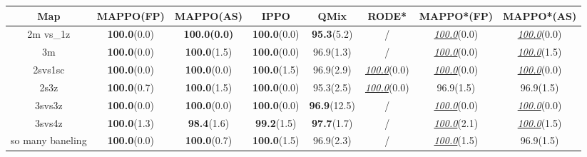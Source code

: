 \documentclass{article}
\theoremstyle{plain}
\theoremstyle{definition}
\theoremstyle{remark}
\begin{document}
\begin{table}[t!]
\centering
\addtolength{\tabcolsep}{-4pt}    
\begin{tabular}{ccccc|ccc}
\toprule 
Map              & MAPPO\scriptsize{(FP)}  & MAPPO\scriptsize{(AS)}  & IPPO       & QMix       & RODE*        & MAPPO*\scriptsize{(FP)}  & MAPPO*\scriptsize{(AS)}  \\
\midrule
\scriptsize{2m vs\_1z}        & \textbf{100.0}\scriptsize{(0.0)} & \textbf{100.0\scriptsize{(0.0)}} & \textbf{100.0}\scriptsize{(0.0)} & \textbf{95.3}\scriptsize{(5.2)}  & /           & \emph{\underline{100.0}}\scriptsize{(0.0)} & \emph{\underline{100.0}}\scriptsize{(0.0)} \\
\scriptsize{3m}               & \textbf{100.0}\scriptsize{(0.0)} & \textbf{100.0}\scriptsize{(1.5)} & \textbf{100.0}\scriptsize{(0.0)} & 96.9\scriptsize{(1.3)}  & /           & \emph{\underline{100.0}}\scriptsize{(0.0)} & \emph{\underline{100.0}}\scriptsize{(1.5)} \\
\scriptsize{2svs1sc}          & \textbf{100.0}\scriptsize{(0.0)} & \textbf{100.0}\scriptsize{(0.0)} & \textbf{100.0}\scriptsize{(1.5)}   & 96.9\scriptsize{(2.9)}  & \emph{\underline{100.0}}\scriptsize{(0.0)}  & \emph{\underline{100.0}}\scriptsize{(0.0)} & \emph{\underline{100.0}}\scriptsize{(0.0)} \\
\scriptsize{2s3z}             & \textbf{100.0}\scriptsize{(0.7)} & \textbf{100.0}\scriptsize{(1.5)} & \textbf{100.0}\scriptsize{(0.0)} & 95.3\scriptsize{(2.5)}  & \emph{\underline{100.0}}\scriptsize{(0.0)}  & 96.9\scriptsize{(1.5)}  & 96.9\scriptsize{(1.5)}  \\
\scriptsize{3svs3z}           & \textbf{100.0}\scriptsize{(0.0)} & \textbf{100.0}\scriptsize{(0.0)} & \textbf{100.0}\scriptsize{(0.0)}   & \textbf{96.9}\scriptsize{(12.5)} & /           & \emph{\underline{100.0}}\scriptsize{(0.0)} & \emph{\underline{100.0}}\scriptsize{(0.0)} \\
\scriptsize{3svs4z}          & \textbf{100.0}\scriptsize{(1.3)} & \textbf{98.4}\scriptsize{(1.6)}  & \textbf{99.2}\scriptsize{(1.5)}  & \textbf{97.7}\scriptsize{(1.7)}  & /           & \emph{\underline{100.0}}\scriptsize{(2.1)} & \emph{\underline{100.0}}\scriptsize{(1.5)} \\
\scriptsize{so many baneling} & \textbf{100.0}\scriptsize{(0.0)} & \textbf{100.0}\scriptsize{(0.7)} & \textbf{100.0}\scriptsize{(1.5)} & 96.9\scriptsize{(2.3)}  & /           & \emph{\underline{100.0}}\scriptsize{(1.5)} & 96.9\scriptsize{(1.5)}  \\

\end{tabular}
\end{table}
\end{document}
